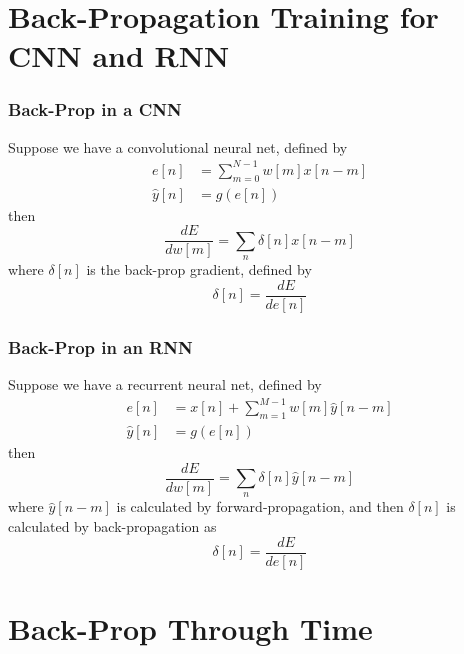 \documentclass{beamer}
\begin{document}
\section[Back-Prop]{Back-Propagation Training for CNN and RNN}
\setcounter{subsection}{1}

\begin{frame}
  \frametitle{Back-Prop in a CNN}
  Suppose we have a convolutional neural net, defined by
  \begin{align*}
    e[n] &= \sum_{m=0}^{N-1}w[m]x[n-m]\\
    \hat{y}[n] &= g\left(e[n]\right)
  \end{align*}
  then 
  \[
  \frac{dE}{dw[m]}=\sum_n \delta[n] x[n-m]
  \]
  where $\delta[n]$ is the back-prop gradient, defined by
  \[
  \delta[n] = \frac{dE}{de[n]}
  \]
\end{frame}

\begin{frame}
  \frametitle{Back-Prop in an RNN}
  Suppose we have a recurrent neural net, defined by
  \begin{align*}
    e[n] &= x[n] + \sum_{m=1}^{M-1}w[m] \hat{y}[n-m]\\
    \hat{y}[n] &= g\left(e[n]\right)
  \end{align*}
  then
  \[
  \frac{dE}{dw[m]} = \sum_n \delta[n] \hat{y}[n-m]
  \]
  where $\hat{y}[n-m]$ is calculated by forward-propagation, and then
  $\delta[n]$ is calculated by back-propagation as
  \[
  \delta[n] = \frac{dE}{de[n]}
  \]
\end{frame}

\section[BPTT]{Back-Prop Through Time}
\setcounter{subsection}{1}
\end{document}
